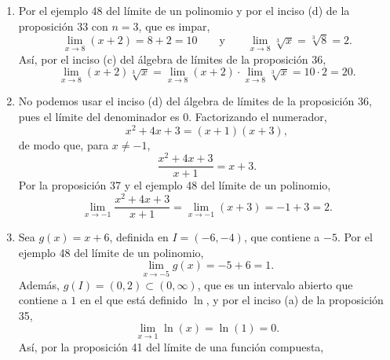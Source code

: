 \documentclass[12pt,a4paper]{article}
\begin{document}
    \begin{solucion}
        \begin{enumerate}
            \item[(a)] Por el ejemplo 48 del límite de un polinomio y por el inciso (d) de la proposición 33 con $n=3$, que es impar,
            \begin{equation*}
                \lim_{x\to8}(x+2)=8+2=10\qquad\text{y}\qquad\lim_{x\to8}\sqrt[3]{x}=\sqrt[3]{8}=2.
            \end{equation*}
            Así, por el inciso (c) del álgebra de límites de la proposición 36,
            \begin{equation*}
                \lim_{x\to8}(x+2)\sqrt[3]{x}=\lim_{x\to8}(x+2)\cdot\lim_{x\to8}\sqrt[3]{x}=10\cdot2=20.
            \end{equation*}
            \item[(b)] No podemos usar el inciso (d) del álgebra de límites de la proposición 36, pues el límite del denominador es $0$. Factorizando el numerador,
            \begin{equation*}
                x^{2}+4x+3=(x+1)(x+3),
            \end{equation*}
            de modo que, para $x\neq-1$,
            \begin{equation*}
                \frac{x^{2}+4x+3}{x+1}=x+3.
            \end{equation*}
            Por la proposición 37 y el ejemplo 48 del límite de un polinomio,
            \begin{equation*}
                \lim_{x\to-1}\frac{x^{2}+4x+3}{x+1}=\lim_{x\to-1}(x+3)=-1+3=2.
            \end{equation*}
            \item[(c)] Sea $g(x)=x+6$, definida en $I=(-6,-4)$, que contiene a $-5$. Por el ejemplo 48 del límite de un polinomio,
            \begin{equation*}
                \lim_{x\to-5}g(x)=-5+6=1.
            \end{equation*}
            Además, $g(I)=(0,2)\subset(0,\infty)$, que es un intervalo abierto que contiene a $1$ en el que está definido $\ln$, y por el inciso (a) de la proposición 35,
            \begin{equation*}
                \lim_{x\to1}\ln(x)=\ln(1)=0.
            \end{equation*}
            Así, por la proposición 41 del límite de una función compuesta,
            \begin{equation*}

\end{equation*}
\end{enumerate}
\end{solucion}
\end{document}
